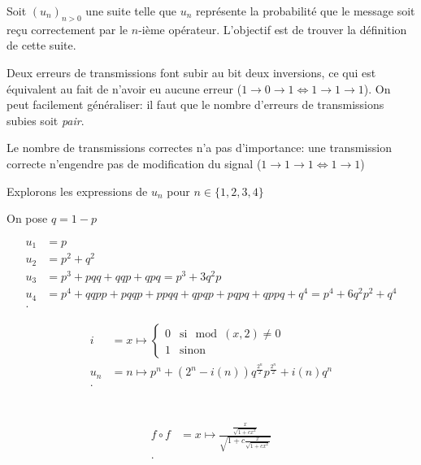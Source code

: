 \documentclass{article}
\begin{document}
Soit $(u_n)_{n>0}$ une suite telle que $u_n$ représente la probabilité que le message
soit reçu correctement par le $n$-ième opérateur. L'objectif est de trouver la définition
de cette suite.

Deux erreurs de transmissions font subir au bit deux inversions, ce qui est équivalent 
au fait de n'avoir eu aucune erreur ($1 \to 0 \to 1 \iff 1 \to 1 \to 1$). 
On peut facilement généraliser: il faut que le nombre d'erreurs de transmissions 
subies soit \emph{pair}.

Le nombre de transmissions correctes n'a pas d'importance: une transmission correcte 
n'engendre pas de modification du signal ($1 \to 1 \to 1 \iff 1 \to 1$)

Explorons les expressions de $u_n$ pour $n \in \{1, 2, 3, 4\}$

On pose $q = 1 - p$

\begin{align*}
	u_1 &= p \\
	u_2 &= p^2 + q^2 \\
	u_3 &= p^3 + pqq + qqp + qpq = p^3 + 3q^2p \\
	u_4 &= p^4 + qqpp + pqqp + ppqq + qpqp + pqpq + qppq + q^4 = p^4 + 6q^2p^2 + q^4 \\
.\end{align*}

\begin{align*}
	i &= x\mapsto \begin{cases}
		0 & \text{si} \mod(x, 2) \neq 0 \\
		1 & \text{sinon}
	\end{cases} \\
	u_n &= n \mapsto p^n + (2^n-i(n))q^{\frac{2^n}{2}}p^{\frac{2^n}{2}} + i(n)q^n \\
.\end{align*}

\section{}
\begin{align*}
	f \circ f &= x \mapsto  \frac{\frac{x}{\sqrt{1+cx^2} }}{\sqrt{1+c\frac{x}{\sqrt{1+cx^2} }} } \\
.\end{align*}
\end{document}
